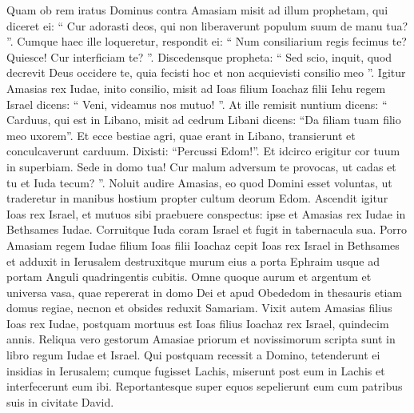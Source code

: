 \begin{biblechapter}
\begin{biblechapter}
\begin{biblechapter}
\begin{biblechapter}
\begin{biblechapter}
\begin{biblechapter}
\begin{biblechapter}
\begin{biblechapter}
\begin{biblechapter}
\begin{biblechapter}
\begin{biblechapter}
\begin{biblechapter}
\begin{biblechapter}
\begin{biblechapter}
\begin{biblechapter}
\begin{biblechapter}
\begin{biblechapter}
\begin{biblechapter}
\begin{biblechapter}
\begin{biblechapter}
\begin{biblechapter}
\begin{biblechapter}
\begin{biblechapter}
\begin{biblechapter}
\begin{biblechapter}
\verse Quam ob rem iratus Dominus contra Amasiam misit ad illum prophetam, qui diceret ei: “ Cur adorasti deos, qui non liberaverunt populum suum de manu tua? ”. 
\verse Cumque haec ille loqueretur, respondit ei: “ Num consiliarium regis fecimus te? Quiesce! Cur interficiam te? ”. Discedensque propheta: “ Sed scio, inquit, quod decrevit Deus occidere te, quia fecisti hoc et non acquievisti consilio meo ”.
 \verse Igitur Amasias rex Iudae, inito consilio, misit ad Ioas filium Ioachaz filii Iehu regem Israel dicens: “ Veni, videamus nos mutuo! ”. 
\verse At ille remisit nuntium dicens: “ Carduus, qui est in Libano, misit ad cedrum Libani dicens: “Da filiam tuam filio meo uxorem”. Et ecce bestiae agri, quae erant in Libano, transierunt et conculcaverunt carduum. 
\verse Dixisti: “Percussi Edom!”. Et idcirco erigitur cor tuum in superbiam. Sede in domo tua! Cur malum adversum te provocas, ut cadas et tu et Iuda tecum? ”.
 \verse Noluit audire Amasias, eo quod Domini esset voluntas, ut traderetur in manibus hostium propter cultum deorum Edom. 
\verse Ascendit igitur Ioas rex Israel, et mutuos sibi praebuere conspectus: ipse et Amasias rex Iudae in Bethsames Iudae. 
\verse Corruitque Iuda coram Israel et fugit in tabernacula sua. 
\verse Porro Amasiam regem Iudae filium Ioas filii Ioachaz cepit Ioas rex Israel in Bethsames et adduxit in Ierusalem destruxitque murum eius a porta Ephraim usque ad portam Anguli quadringentis cubitis. 
\verse Omne quoque aurum et argentum et universa vasa, quae repererat in domo Dei et apud Obededom in thesauris etiam domus regiae, necnon et obsides reduxit Samariam.
 \verse Vixit autem Amasias filius Ioas rex Iudae, postquam mortuus est Ioas filius Ioachaz rex Israel, quindecim annis. 
\verse Reliqua vero gestorum Amasiae priorum et novissimorum scripta sunt in libro regum Iudae et Israel.
 \verse Qui postquam recessit a Domino, tetenderunt ei insidias in Ierusalem; cumque fugisset Lachis, miserunt post eum in Lachis et interfecerunt eum ibi. 
\verse Reportantesque super equos sepelierunt eum cum patribus suis in civitate David.
 

\end{biblechapter}
\end{biblechapter}
\end{biblechapter}
\end{biblechapter}
\end{biblechapter}
\end{biblechapter}
\end{biblechapter}
\end{biblechapter}
\end{biblechapter}
\end{biblechapter}
\end{biblechapter}
\end{biblechapter}
\end{biblechapter}
\end{biblechapter}
\end{biblechapter}
\end{biblechapter}
\end{biblechapter}
\end{biblechapter}
\end{biblechapter}
\end{biblechapter}
\end{biblechapter}
\end{biblechapter}
\end{biblechapter}
\end{biblechapter}
\end{biblechapter}
